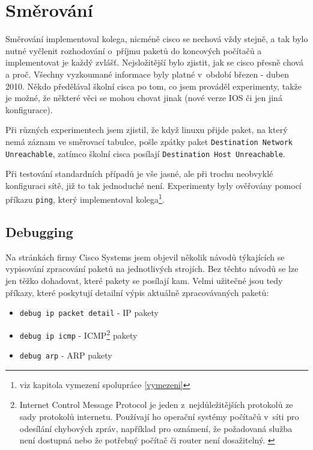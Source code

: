 \section{Směrování} \label{prijmiEthernetove}
Směrování implementoval kolega, nicméně cisco se nechová vždy stejně, a tak bylo nutné vyčlenit rozhodování o~příjmu paketů do koncových počítačů a implementovat je každý zvlášť. Nejsložitější bylo zjistit, jak se cisco přesně chová a proč. Všechny vyzkoumané informace byly platné v~období březen - duben 2010. Někdo předělával školní cisca po tom, co jsem prováděl experimenty, takže je možné, že některé věci se mohou chovat jinak (nové verze IOS či jen jiná konfigurace). 

Při různých experimentech jsem zjistil, že když linuxu přijde paket, na který nemá záznam ve směrovací tabulce, pošle zpátky paket \verb|Destination Network Unreachable|, zatímco školní cisca posílají \verb|Destination Host Unreachable|.

Při testování standardních případů je vše jasné, ale při trochu neobvyklé konfiguraci sítě, již to tak jednoduché není. Experimenty byly ověřovány pomocí příkazu \verb|ping|, který implementoval kolega\footnote{viz kapitola vymezení spolupráce \ref{vymezeni}}. 


\subsection{Debugging}
Na stránkách firmy Cisco Systems jsem objevil několik návodů týkajících se vypisování zpracování paketů na jednotlivých strojích. Bez těchto návodů se lze jen těžko dohadovat, které pakety se posílají kam. Velmi užitečné jsou tedy příkazy, které poskytují detailní výpis aktuálně zpracovávaných paketů:

\begin{itemize}
 \item \verb|debug ip packet detail| - IP pakety 
 \item \verb|debug ip icmp| - ICMP\footnote{Internet Control Message Protocol je jeden z~nejdůležitějších protokolů ze sady protokolů internetu. Používají ho operační systémy počítačů v~síti pro odesílání chybových zpráv, například pro oznámení, že požadovaná služba není dostupná nebo že potřebný počítač či router není dosažitelný. \cite{wiki:icmp}} pakety
 \item \verb|debug arp| - ARP pakety
\end{itemize}

